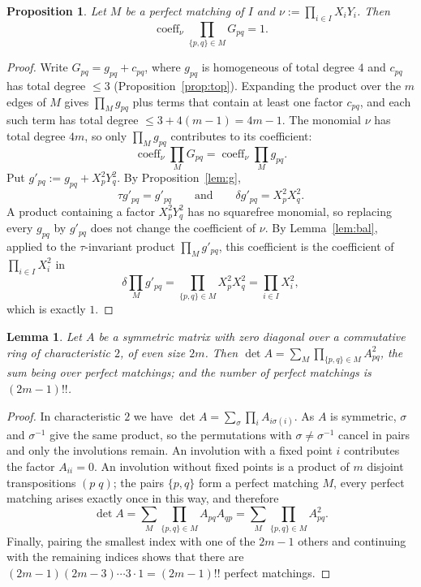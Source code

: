 \documentclass[11pt]{amsart}
\newtheorem{lemma}[theorem]{Lemma}
\newtheorem{proposition}[theorem]{Proposition}
\theoremstyle{remark}
\newcommand{\coeff}{\operatorname{coeff}}
\newcommand{\1}{\mathbf{1}}
\begin{document}
\begin{proposition}\label{prop:matching}
Let $M$ be a perfect matching of $I$ and $\nu:=\prod_{i\in I}X_iY_i$. Then
\[\coeff_\nu\prod_{\{p,q\}\in M}G_{pq}=1 .\]
\end{proposition}
\begin{proof}
Write $G_{pq}=g_{pq}+c_{pq}$, where $g_{pq}$ is homogeneous of total degree $4$ and $c_{pq}$ has total degree $\le3$
(Proposition~\ref{prop:top}). Expanding the product over the $m$ edges of $M$ gives $\prod_Mg_{pq}$ plus terms that contain
at least one factor $c_{pq}$, and each such term has total degree $\le3+4(m-1)=4m-1$. The monomial $\nu$ has total degree
$4m$, so only $\prod_Mg_{pq}$ contributes to its coefficient:
\[\coeff_\nu\prod_{M} G_{pq}=\coeff_\nu\prod_{M} g_{pq}.\]
Put $g'_{pq}:=g_{pq}+X_p^2Y_q^2$. By Proposition~\ref{lem:g},
\[\tau g'_{pq}=g'_{pq}\qquad\text{and}\qquad \delta g'_{pq}=X_p^2X_q^2 .\]
A product containing a factor $X_p^2Y_q^2$ has no squarefree monomial, so replacing every $g_{pq}$ by $g'_{pq}$ does
not change the coefficient of $\nu$. By Lemma~\ref{lem:bal}, applied to the $\tau$-invariant product $\prod_M g'_{pq}$,
this coefficient is the coefficient of $\prod_{i\in I}X_i^2$ in
\[\delta\prod_{M} g'_{pq}=\prod_{\{p,q\}\in M}X_p^2X_q^2=\prod_{i\in I}X_i^2,\]
which is exactly $1$.
\end{proof}

\begin{lemma}\label{lem:det}
Let $A$ be a symmetric matrix with zero diagonal over a commutative ring of characteristic $2$, of even size $2m$. Then
$\det A=\sum_M\prod_{\{p,q\}\in M}A_{pq}^2$, the sum being over perfect matchings; and the number of perfect matchings is
$(2m-1)!!$.
\end{lemma}
\begin{proof}
In characteristic $2$ we have $\det A=\sum_\sigma\prod_iA_{i\sigma(i)}$. As $A$ is symmetric, $\sigma$ and $\sigma^{-1}$ give the same product, so the permutations with
$\sigma\ne\sigma^{-1}$ cancel in pairs and only the involutions remain. An involution with a fixed point $i$ contributes the
factor $A_{ii}=0$. An involution without fixed points is a product of $m$ disjoint transpositions $(p\;q)$; the pairs
$\{p,q\}$ form a perfect matching $M$, every perfect matching arises exactly once in this way, and therefore
\[
\det A=\sum_M\prod_{\{p,q\}\in M}A_{pq}A_{qp}=\sum_M\prod_{\{p,q\}\in M}A_{pq}^2 .
\]
Finally, pairing the smallest index with one of the $2m-1$
others and continuing with the remaining indices shows that there are $(2m-1)(2m-3)\cdots3\cdot1=(2m-1)!!$
perfect matchings.
\end{proof}
\end{document}
